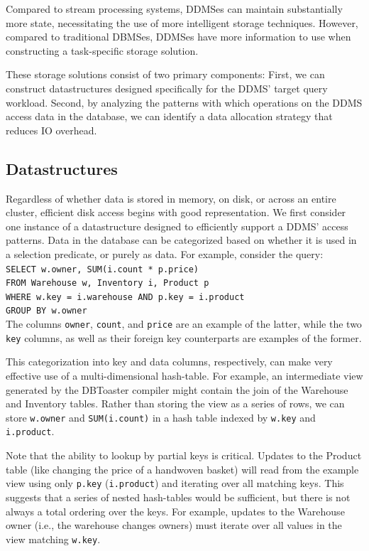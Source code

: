 Compared to stream processing systems, DDMSes can maintain substantially more state, necessitating the use of more intelligent storage techniques.  However, compared to traditional DBMSes, DDMSes have more information to use when constructing a task-specific storage solution.  

These storage solutions consist of two primary components: First, we can construct datastructures designed specifically for the DDMS' target query workload.  Second, by analyzing the patterns with which operations on the DDMS access data in the database, we can identify a data allocation strategy that reduces IO overhead.

\subsection{Datastructures}
Regardless of whether data is stored in memory, on disk, or across an entire cluster, efficient disk access begins with good representation.  We first consider one instance of a datastructure designed to efficiently support a DDMS' access patterns.  Data in the database can be categorized based on whether it is used in a selection predicate, or purely as data.  For example, consider the query:\texttt{\\
SELECT w.owner, SUM(i.count * p.price)\\
FROM Warehouse w, Inventory i, Product p\\
WHERE w.key = i.warehouse AND p.key = i.product\\
GROUP BY w.owner\\
}
The columns \texttt{owner}, \texttt{count}, and \texttt{price} are an example of the latter, while the two \texttt{key} columns, as well as their foreign key counterparts are examples of the former.  

This categorization into key and data columns, respectively, can make very effective use of a multi-dimensional hash-table.  For example, an intermediate view generated by the DBToaster compiler might contain the join of the Warehouse and Inventory tables.  Rather than storing the view as a series of rows, we can store \texttt{w.owner} and \texttt{SUM(i.count)} in a hash table indexed by \texttt{w.key} and \texttt{i.product}.  

Note that the ability to lookup by partial keys is critical.  Updates to the Product table (like changing the price of a handwoven basket) will read from the example view using only \texttt{p.key} (\texttt{i.product}) and iterating over all matching keys.  This suggests that a series of nested hash-tables would be sufficient, but there is not always a total ordering over the keys.  For example, updates to the Warehouse owner (i.e., the warehouse changes owners) must iterate over all values in the view matching \texttt{w.key}.  

